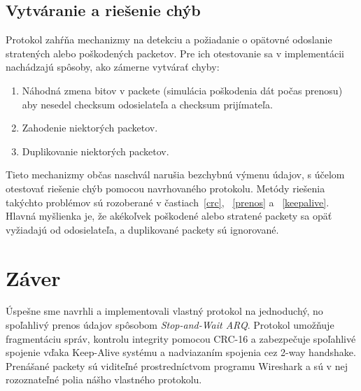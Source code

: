\documentclass[a4paper,12pt]{article}
\begin{document}
    \subsection{Vytváranie a riešenie chýb}
    Protokol zahŕňa mechanizmy na detekciu a požiadanie o opätovné odoslanie stratených alebo poškodených packetov. Pre ich otestovanie sa v implementácii nachádzajú spôsoby, ako zámerne vytvárať chyby:
	\begin{enumerate}
		\item Náhodná zmena bitov v packete (simulácia poškodenia dát počas prenosu) aby nesedel checksum odosielateľa a checksum prijímateľa.
		\item Zahodenie niektorých packetov.
		\item Duplikovanie niektorých packetov. 
	\end{enumerate}

	Tieto mechanizmy občas naschvál narušia bezchybnú výmenu údajov, s účelom otestovať riešenie chýb pomocou navrhovaného protokolu. Metódy riešenia takýchto problémov sú rozoberané v častiach~\ref{crc}, ~\ref{prenos} a ~\ref{keepalive}. Hlavná myšlienka je, že akékoľvek poškodené alebo stratené packety sa opäť vyžiadajú od odosielateľa, a duplikované packety sú ignorované.


\section{Záver}
	Úspešne sme navrhli a implementovali vlastný protokol na jednoduchý, no spoľahlivý prenos údajov spôsobom \textit{Stop-and-Wait ARQ}. Protokol umožňuje fragmentáciu správ, kontrolu integrity pomocou CRC-16 a zabezpečuje spoľahlivé spojenie vďaka Keep-Alive systému a nadviazaním spojenia cez 2-way handshake. Prenášané packety sú viditeľné prostredníctvom programu Wireshark a sú v nej rozoznateľné polia nášho vlastného protokolu.
\end{document}
